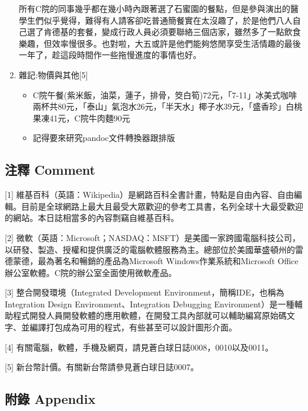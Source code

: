 \documentclass[a5paper, 12pt
]{book}
\providecommand{\tightlist}{%
  \setlength{\itemsep}{0pt}\setlength{\parskip}{0pt}}
\begin{document}
\begin{enumerate}
  所有C院的同事幾乎都在幾小時內跟著選了石蜜園的餐點，但是參與演出的醫學生們似乎覺得，難得有人請客卻吃普通簡餐實在太沒趣了，於是他們八人自己選了肯德基的套餐，變成行政人員必須要聯絡三個店家，雖然多了一點飲食樂趣，但效率慢很多。也對啦，大五或許是他們能夠悠閒享受生活情趣的最後一年了，趁這段時間作一些拖慢進度的事情也好。
\item
  雜記:物價與其他{[}5{]}

  \begin{itemize}
  \tightlist
  \item
    C院午餐(紫米飯，油菜，蓮子，排骨，筊白筍)72元，「7-11」冰美式咖啡兩杯共80元，「泰山」氣泡水26元，「半天水」椰子水39元，「盛香珍」白桃果凍41元，C院牛肉麵90元
  \item
    記得要來研究pandoc文件轉換器跟排版
  \end{itemize}
\end{enumerate}

\hypertarget{ux6ce8ux91cb-comment-19}{%
\subsection{注釋 Comment}\label{ux6ce8ux91cb-comment-19}}

{[}1{]}
維基百科（英語：Wikipedia）是網路百科全書計畫，特點是自由內容、自由編輯。目前是全球網路上最大且最受大眾歡迎的參考工具書，名列全球十大最受歡迎的網站。本日誌相當多的內容剽竊自維基百科。

{[}2{]}
微軟（英語：Microsoft；NASDAQ：MSFT）是美國一家跨國電腦科技公司，以研發、製造、授權和提供廣泛的電腦軟體服務為主。總部位於美國華盛頓州的雷德蒙德，最為著名和暢銷的產品為Microsoft
Windows作業系統和Microsoft
Office辦公室軟體。C院的辦公室全面使用微軟產品。

{[}3{]} 整合開發環境（Integrated Development
Environment，簡稱IDE，也稱為Integration Design Environment、Integration
Debugging
Environment）是一種輔助程式開發人員開發軟體的應用軟體，在開發工具內部就可以輔助編寫原始碼文字、並編譯打包成為可用的程式，有些甚至可以設計圖形介面。

{[}4{]} 有關電腦，軟體，手機及網頁，請見蒼白球日誌0008，0010以及0011。

{[}5{]} 新台幣計價。有關新台幣請參見蒼白球日誌0007。

\hypertarget{ux9644ux9304-appendix-18}{%
\subsection{附錄 Appendix}\label{ux9644ux9304-appendix-18}}
\end{document}
